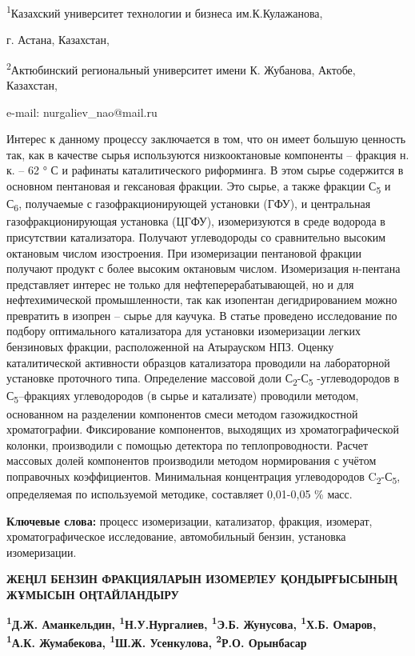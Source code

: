 \textsuperscript{1}Казахский университет технологии и бизнеса
им.К.Кулажанова,

г. Астана, Казахстан,

\textsuperscript{2}Актюбинский региональный университет имени К.
Жубанова, Актобе, Казахстан,

e-mail: nurgaliev\_nao@mail.ru

Интерес к данному процессу заключается в том, что он имеет большую
ценность так, как в качестве сырья используются низкооктановые
компоненты -- фракция н. к. -- 62 ° С и рафинаты каталитического
риформинга. В этом сырье содержится в основном пентановая и гексановая
фракции. Это сырье, а также фракции С\textsubscript{5} и
С\textsubscript{6}, получаемые с газофракционирующей установки (ГФУ), и
центральная газофракционирующая установка (ЦГФУ), изомеризуются в среде
водорода в присутствии катализатора. Получают углеводороды со
сравнительно высоким октановым числом изостроения. При изомеризации
пентановой фракции получают продукт с более высоким октановым числом.
Изомеризация н-пентана представляет интерес не только для
нефтеперерабатывающей, но и для нефтехимической промышленности, так как
изопентан дегидрированием можно превратить в изопрен -- сырье для
каучука. В статье проведено исследование по подбору оптимального
катализатора для установки изомеризации легких бензиновых фракции,
расположенной на Атырауском НПЗ. Оценку каталитической активности
образцов катализатора проводили на лабораторной установке проточного
типа. Определение массовой доли С\textsubscript{2}-С\textsubscript{5}
-углеводородов в С\textsubscript{5}--фракциях углеводородов (в сырье и
катализате) проводили методом, основанном на разделении компонентов
смеси методом газо­жидкостной хроматографии. Фиксирование компонентов,
выходящих из хроматографической колонки, производили с помощью детектора
по теплопроводности. Расчет массовых долей компонентов производили
методом нормирова­ния с учётом поправочных коэффициентов. Минимальная
концентрация углеводородов C\textsubscript{2}-С\textsubscript{5},
определяемая по используемой методике, составляет 0,01-0,05 \% масс.

\textbf{Ключевые слова:} процесс изомеризации, катализатор, фракция,
изомерат, хроматографическое исследование, автомобильный бензин,
установка изомеризации.

\textbf{ЖЕҢІЛ БЕНЗИН ФРАКЦИЯЛАРЫН ИЗОМЕРЛЕУ ҚОНДЫРҒЫСЫНЫҢ ЖҰМЫСЫН
ОҢТАЙЛАНДЫРУ}

\textbf{\textsuperscript{1}Д.Ж. Аманкельдин,
\textsuperscript{1}Н.У.Нургалиев, \textsuperscript{1}Э.Б. Жунусова,
\textsuperscript{1}Х.Б. Омаров,\\
\textsuperscript{1}А.К. Жумабекова, \textsuperscript{1}Ш.Ж. Усенкулова,
\textsuperscript{2}Р.О. Орынбасар}

